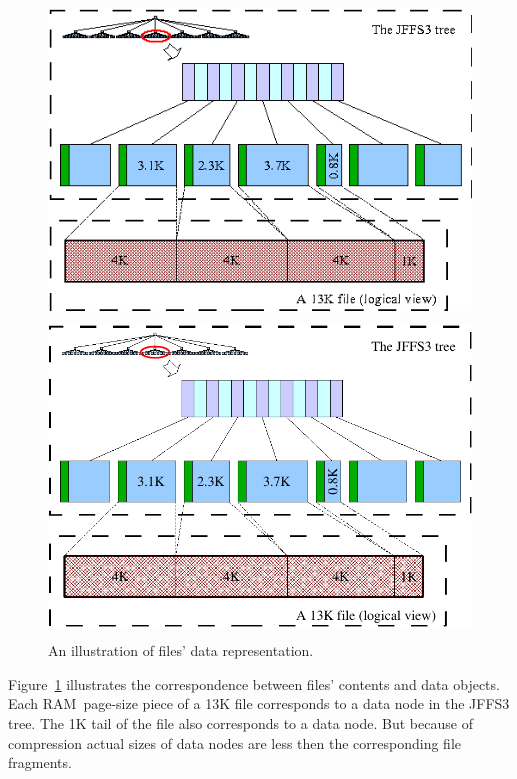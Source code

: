 \begin{enumerate}
%
%
\begin{figure}[h]
\begin{center}
\begin{htmlonly}
\includegraphics{pics/dataobj-01.png}
\end{htmlonly}
\includegraphics[width=130mm,height=85mm]{pics/dataobj-01.pdf}
\end{center}
\caption{An illustration of files' data representation.}
\label{ref_FigureDataObj-01}
\end{figure}

Figure~\ref{ref_FigureDataObj-01} illustrates the correspondence between files'
contents and data objects. Each \mbox{RAM~page-size} piece of a 13K file
corresponds to a data node in the JFFS3 tree. The 1K tail of the file also
corresponds to a data node. But because of compression actual sizes of data
nodes are less then the corresponding file fragments.


\end{enumerate}
